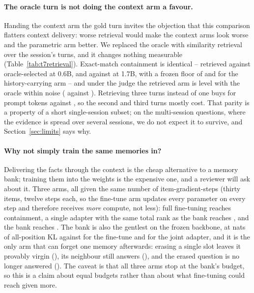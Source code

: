 \documentclass[11pt]{article}
\begin{document}
\paragraph{The oracle turn is not doing the context arm a favour.} Handing the context arm
the gold turn invites the objection that this comparison flatters context delivery: worse
retrieval would make the context arms look worse and the parametric arm better. We replaced
the oracle with similarity retrieval over the session's turns, and it changes nothing
measurable (Table~\ref{tab:t7retrieval}). Exact-match containment is identical -- \tRagTopOne{} retrieved against
\tOracleContextBase{} oracle-selected at 0.6B, and \tRagTopOneLarge{} against
\tOracleContextLarge{} at 1.7B, with a frozen floor of \tFrozenBase{} and
\tAllContextBase{} for the history-carrying arm -- and under the judge the retrieved arm is level with the
oracle within noise (\tJudgeRagOne{} against \tJudgeContextTarget{}). Retrieving three
turns instead of one buys \tRagTopThree{} for \tRagTopThreeTokens{} prompt tokens against
\tRagTopOneTokens{}, so the second and third turns mostly cost. That parity is a property
of a short single-session subset; on the multi-session questions, where the evidence is
spread over several sessions, we do not expect it to survive, and
Section~\ref{sec:limits} says why.

\paragraph{Why not simply train the same memories in?} Delivering the facts through the
context is the cheap alternative to a memory bank; training them into the weights is the
expensive one, and a reviewer will ask about it. Three arms, all given the same number of
item-gradient-steps (thirty items, twelve steps each, so the fine-tune arm updates every
parameter on every step and therefore receives \emph{more} compute, not less): full
fine-tuning reaches \tBaseFull{} containment, a single adapter with the same total rank as
the bank reaches \tBaseAdapter{}, and the bank reaches \tBaseSlots{}. The bank is
also the gentlest on the frozen backbone, at \tBaseSlotsKl{} nats of all-position KL
against \tBaseFullKl{} for the fine-tune and \tBaseAdapterKl{} for the joint adapter, and
it is the only arm that can forget one memory afterwards: erasing a single slot leaves it
provably virgin (\tBaseErasedVirgin{}), its neighbour still answers
(\tBaseNeighbourKept{}), and the erased question is no longer answered
(\tBaseErasedGone{}). The caveat is that all three arms stop at the bank's budget, so this
is a claim about equal budgets rather than about what fine-tuning could reach given
more.
\end{document}
